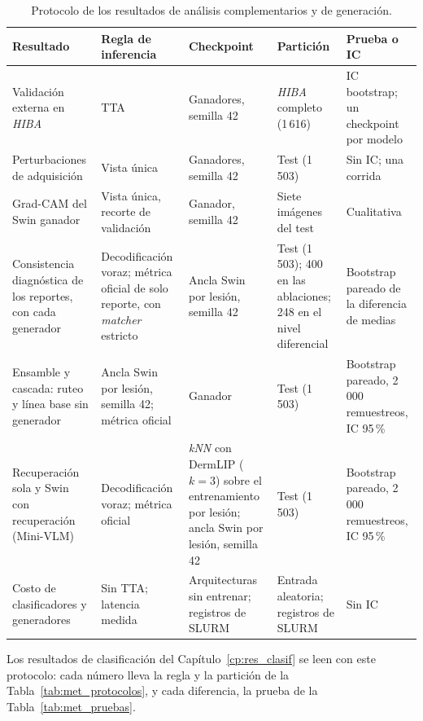 \begingroup
\small
\setlength{\tabcolsep}{3pt}
\begin{table}[H]
    \centering
    \caption{Protocolo de los resultados de análisis complementarios y de generación.}
    \label{tab:met_protocolos_analisis}
    \begin{tabularx}{\textwidth}{@{}>{\raggedright\arraybackslash}p{3.6cm}
        >{\raggedright\arraybackslash\hspace{0pt}}X
        >{\raggedright\arraybackslash\hspace{0pt}}X
        >{\raggedright\arraybackslash\hspace{0pt}}X
        >{\raggedright\arraybackslash\hspace{0pt}}X@{}}
        \toprule
        \textbf{Resultado} & \textbf{Regla de inferencia} & \textbf{Checkpoint} & \textbf{Partición} & \textbf{Prueba o IC} \\
        \midrule
        Validación externa en \emph{HIBA}
            & TTA & Ganadores, semilla 42 & \emph{HIBA} completo (1\,616) & IC bootstrap; un checkpoint por modelo \\
        \filasep
        Perturbaciones de adquisición
            & Vista única & Ganadores, semilla 42 & Test (1\,503) & Sin IC; una corrida \\
        \filasep
        Grad-CAM del Swin ganador
            & Vista única, recorte de validación & Ganador, semilla 42 & Siete imágenes del test & Cualitativa \\
        \filasep
        Consistencia diagnóstica de los reportes, con cada generador
            & Decodificación voraz; métrica oficial de solo reporte, con \emph{matcher} estricto
            & Ancla Swin por lesión, semilla 42
            & Test (1\,503); 400 en las ablaciones; 248 en el nivel diferencial
            & Bootstrap pareado de la diferencia de medias \\
        \filasep
        Ensamble y cascada: ruteo y línea base sin generador
            & Ancla Swin por lesión, semilla 42; métrica oficial & Ganador & Test (1\,503)
            & Bootstrap pareado, 2\,000 remuestreos, IC 95\,\% \\
        \filasep
        Recuperación sola y Swin con recuperación (Mini-VLM)
            & Decodificación voraz; métrica oficial
            & \emph{kNN} con DermLIP ($k = 3$) sobre el entrenamiento por lesión; ancla Swin por lesión, semilla 42
            & Test (1\,503)
            & Bootstrap pareado, 2\,000 remuestreos, IC 95\,\% \\
        \filasep
        Costo de clasificadores y generadores
            & Sin TTA; latencia medida & Arquitecturas sin entrenar; registros de SLURM
            & Entrada aleatoria; registros de SLURM & Sin IC \\
        \bottomrule
    \end{tabularx}
\end{table}
\endgroup

Los resultados de clasificación del Capítulo~\ref{cp:res_clasif} se leen con este protocolo: cada número lleva la regla y
la partición de la Tabla~\ref{tab:met_protocolos}, y cada diferencia, la prueba de la Tabla~\ref{tab:met_pruebas}.
